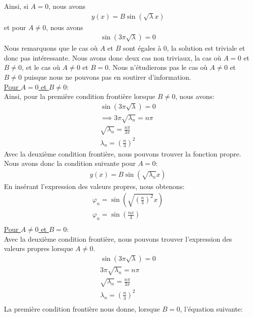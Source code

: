 \documentclass{article}
\begin{document}
Ainsi, si $A=0$, nous avons
\begin{gather*}
    y(x)=B\sin(\sqrt{\lambda}x)
\end{gather*}
et pour $A\neq0$, nous avons
\begin{gather*}
    \sin(3\pi\sqrt{\lambda})=0
\end{gather*}
Nous remarquons que le cas où $A$ et $B$ sont égales à 0, la solution est triviale et donc pas intéressante. Nous avons donc deux cas non triviaux, la cas où $A=0$ et $B\neq0$, et le cas où $A\neq0$ et $B=0$. Nous n'étudierons pas le cas où $A\neq0$ et $B\neq0$ puisque nous ne pouvons pas en soutirer d'information.\\
\underline{Pour $A=0$ et $B\neq0$}:\\
Ainsi, pour la première condition frontière lorsque $B\neq0$, nous avons:
\begin{gather*}
    \sin(3\pi\sqrt{\lambda})=0\\
    \implies 3\pi\sqrt{\lambda_n}=n\pi \tag*{où $n=1, 2, 3,...$}\\
    \sqrt{\lambda_n}=\frac{n\pi}{3\pi}\\
    \lambda_n=(\frac{n}{3})^2 \tag*{où $n=1, 2, 3,...$}
\end{gather*}
Avec la deuxième condition frontière, nous pouvons trouver la fonction propre. Nous avons donc la condition suivante pour $A=0$:
\begin{gather*}
    y(x)=B\sin(\sqrt{\lambda_n}x)
\end{gather*}
En insérant l'expression des valeurs propres, nous obtenons:
\begin{gather*}
    \varphi_n=\sin(\sqrt{(\frac{n}{3})^2}x)\\
    \varphi_n=\sin(\frac{n x}{3})\tag*{où $n=1, 2, 3,...$}\\
\end{gather*}
\underline{Pour $A\neq0$ et $B=0$}:\\
Avec la deuxième condition frontière, nous pouvons trouver l'expression des valeurs propres lorsque $A\neq0$.
\begin{gather*}
    \sin(3\pi\sqrt{\lambda})=0\\
    3\pi\sqrt{\lambda_n}=n\pi \tag*{où $n=1, 2, 3,...$}\\
    \sqrt{\lambda_n}=\frac{n\pi}{3\pi}\\
    \lambda_n=(\frac{n}{3})^2\\
\end{gather*}
La première condition frontière nous donne, lorsque $B=0$, l'équation suivante:
\end{document}
